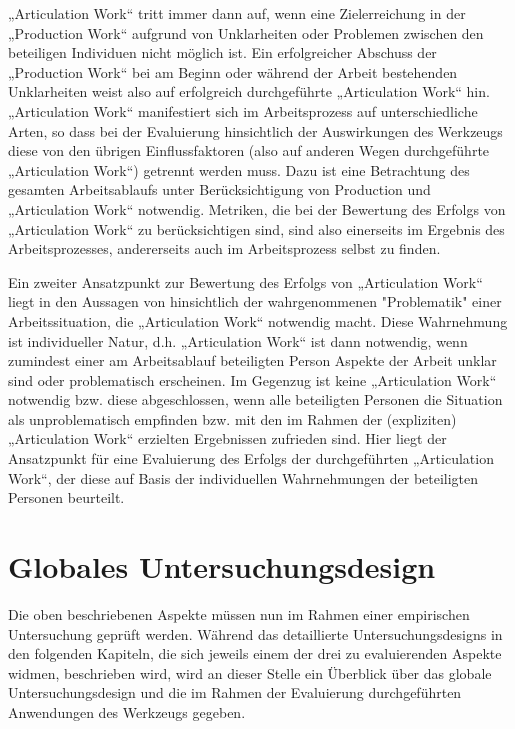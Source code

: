 „Articulation Work“ tritt immer dann auf, wenn eine Zielerreichung in der „Production Work“ aufgrund von Unklarheiten oder Problemen zwischen den beteiligen Individuen nicht möglich ist. Ein erfolgreicher Abschuss der „Production Work“ bei am Beginn oder während der Arbeit bestehenden Unklarheiten weist also auf erfolgreich durchgeführte „Articulation Work“ hin. „Articulation Work“ manifestiert sich im Arbeitsprozess auf unterschiedliche Arten, so dass bei der Evaluierung hinsichtlich der Auswirkungen des Werkzeugs diese von den übrigen Einflussfaktoren (also auf anderen Wegen durchgeführte „Articulation Work“) getrennt werden muss. Dazu ist eine Betrachtung des gesamten Arbeitsablaufs unter Berücksichtigung von Production und „Articulation Work“ notwendig. Metriken, die bei der Bewertung des Erfolgs von „Articulation Work“ zu berücksichtigen sind, sind also einerseits im Ergebnis des Arbeitsprozesses, andererseits auch im Arbeitsprozess selbst zu finden.

Ein zweiter Ansatzpunkt zur Bewertung des Erfolgs von „Articulation Work“ liegt in den Aussagen von \citet{Strauss93} hinsichtlich der wahrgenommenen "Problematik" einer Arbeitssituation, die „Articulation Work“ notwendig macht. Diese Wahrnehmung ist individueller Natur, d.h. „Articulation Work“ ist dann notwendig, wenn zumindest einer am Arbeitsablauf beteiligten Person Aspekte der Arbeit unklar sind oder problematisch erscheinen. Im Gegenzug ist keine „Articulation Work“ notwendig bzw. diese abgeschlossen, wenn alle beteiligten Personen die Situation als unproblematisch empfinden bzw. mit den im Rahmen der (expliziten) „Articulation Work“ erzielten Ergebnissen zufrieden sind. Hier liegt der Ansatzpunkt für eine Evaluierung des Erfolgs der durchgeführten „Articulation Work“, der diese auf Basis der individuellen Wahrnehmungen der beteiligten Personen beurteilt.

\section{Globales Untersuchungsdesign}
\label{sec:globales_untersuchungsdesign}

Die oben beschriebenen Aspekte müssen nun im Rahmen einer empirischen Untersuchung geprüft werden. Während das detaillierte Untersuchungsdesigns in den folgenden Kapiteln, die sich jeweils einem der drei zu evaluierenden Aspekte widmen, beschrieben wird, wird an dieser Stelle ein Überblick über das globale Untersuchungsdesign und die im Rahmen der Evaluierung durchgeführten Anwendungen des Werkzeugs gegeben.

